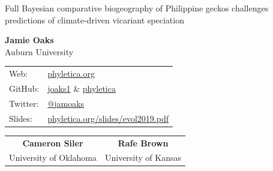 % 
\begin{frame}[t]
    \vspace{4ex}
    \begin{displaybox}[0.95\linewidth]
    \begin{center}
        \begin{minipage}[c][0.15\textheight][c]{0.95\linewidth}
            \begin{center}
                \Large Full Bayesian comparative biogeography of Philippine
                geckos challenges predictions of climate-driven vicariant
                speciation
            \end{center}
        \end{minipage}
    \end{center}
    \end{displaybox}

    \vspace{1ex}
    \begin{center}
        {\Large\bf Jamie Oaks} \\
        Auburn University \\
        \begin{tabular}{@{}ll@{}}
            Web: & \href{http://phyletica.org}{phyletica.org} \\
            GitHub: & \href{https://github.com/joaks1}{joaks1} \& \href{https://github.com/phyletica}{phyletica} \\
            Twitter: & \href{https://twitter.com/jamoaks}{{@}jamoaks} \\
            Slides: & \href{http://phyletica.org/slides/evol2019.pdf}{phyletica.org/slides/evol2019.pdf} 
        \end{tabular}

        \vspace{4ex}
        \begin{tabular}{@{}c@{\hskip 8em}c@{}}
        {\Large\bf Cameron Siler} & {\Large\bf Rafe Brown} \\
        University of Oklahoma & University of Kansas
        \end{tabular}
    \end{center}
\end{frame}


